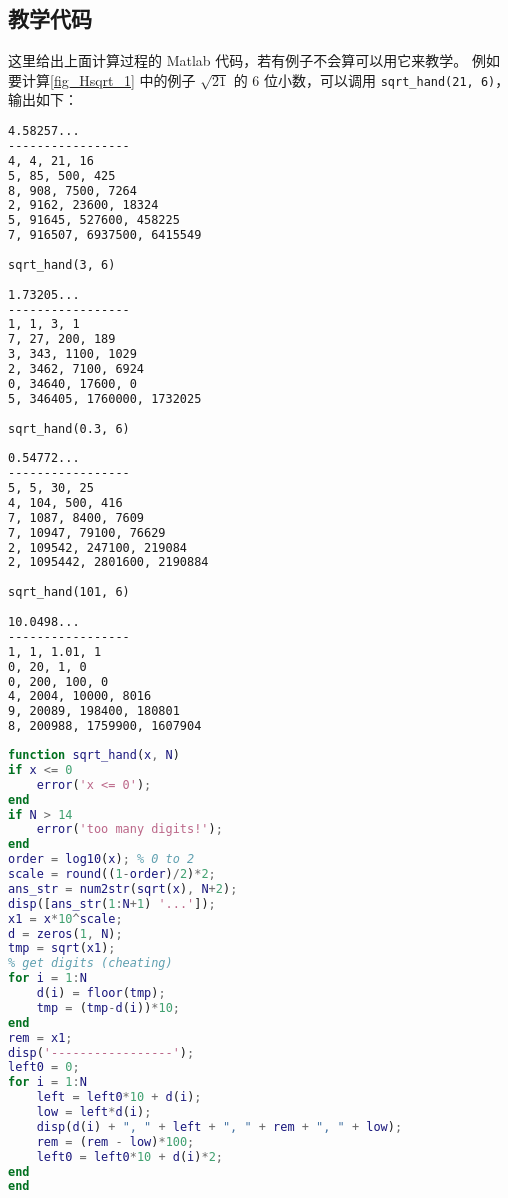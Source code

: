 \subsection{教学代码}
这里给出上面计算过程的 Matlab 代码，若有例子不会算可以用它来教学。 例如要计算\autoref{fig_Hsqrt_1} 中的例子 $\sqrt{21}$ 的 6 位小数，可以调用 \verb|sqrt_hand(21, 6)|， 输出如下：
\begin{lstlisting}[language=bash]
4.58257...
-----------------
4, 4, 21, 16
5, 85, 500, 425
8, 908, 7500, 7264
2, 9162, 23600, 18324
5, 91645, 527600, 458225
7, 916507, 6937500, 6415549
\end{lstlisting}
\verb|sqrt_hand(3, 6)|
\begin{lstlisting}[language=bash]
1.73205...
-----------------
1, 1, 3, 1
7, 27, 200, 189
3, 343, 1100, 1029
2, 3462, 7100, 6924
0, 34640, 17600, 0
5, 346405, 1760000, 1732025
\end{lstlisting}
\verb|sqrt_hand(0.3, 6)|
\begin{lstlisting}[language=bash]
0.54772...
-----------------
5, 5, 30, 25
4, 104, 500, 416
7, 1087, 8400, 7609
7, 10947, 79100, 76629
2, 109542, 247100, 219084
2, 1095442, 2801600, 2190884
\end{lstlisting}
\verb|sqrt_hand(101, 6)|
\begin{lstlisting}[language=bash]
10.0498...
-----------------
1, 1, 1.01, 1
0, 20, 1, 0
0, 200, 100, 0
4, 2004, 10000, 8016
9, 20089, 198400, 180801
8, 200988, 1759900, 1607904
\end{lstlisting}

\begin{lstlisting}[language=matlab,caption=sqrt\_hand.m]
function sqrt_hand(x, N)
if x <= 0
    error('x <= 0');
end
if N > 14
    error('too many digits!');
end
order = log10(x); % 0 to 2
scale = round((1-order)/2)*2;
ans_str = num2str(sqrt(x), N+2);
disp([ans_str(1:N+1) '...']);
x1 = x*10^scale;
d = zeros(1, N);
tmp = sqrt(x1);
% get digits (cheating)
for i = 1:N
    d(i) = floor(tmp);
    tmp = (tmp-d(i))*10;
end
rem = x1;
disp('-----------------');
left0 = 0;
for i = 1:N
    left = left0*10 + d(i);
    low = left*d(i);
    disp(d(i) + ", " + left + ", " + rem + ", " + low);
    rem = (rem - low)*100;
    left0 = left0*10 + d(i)*2;
end
end
\end{lstlisting}
